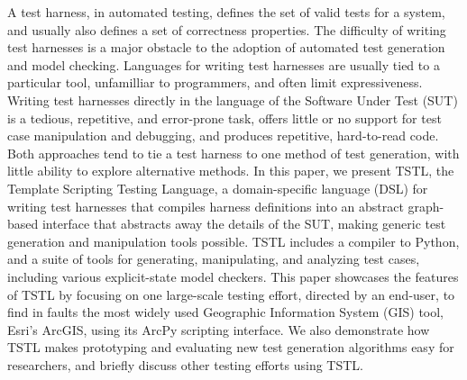 A test harness, in automated testing, defines the set of valid tests
for a system, and usually also defines a set of correctness
properties.  The difficulty of writing test harnesses is a major
obstacle to the adoption of automated test generation and model
checking.  Languages for writing test harnesses are usually tied to a
particular tool, unfamilliar to programmers, and often limit
expressiveness.  Writing test harnesses directly in the language of
the Software Under Test (SUT) is a tedious, repetitive, and
error-prone task, offers little or no support for test case
manipulation and debugging, and produces repetitive, hard-to-read
code.  Both approaches tend to tie a test harness to one method of
test generation, with little ability to explore alternative methods.
In this paper, we present TSTL, the Template Scripting Testing
Language, a domain-specific language (DSL) for writing test harnesses
that compiles harness definitions into an abstract graph-based
interface that abstracts away the details of the SUT, making generic
test generation and manipulation tools possible.  TSTL includes a
compiler to Python, and a suite of tools for generating, manipulating,
and analyzing test cases, including various explicit-state model
checkers.  This paper showcases the features of TSTL by focusing on
one large-scale testing effort, directed by an end-user, to find in
faults the most widely used Geographic Information System (GIS) tool,
Esri's ArcGIS, using its ArcPy scripting interface.  We also
demonstrate how TSTL makes prototyping and evaluating new test
generation algorithms easy for researchers, and briefly discuss other
testing efforts using TSTL.


